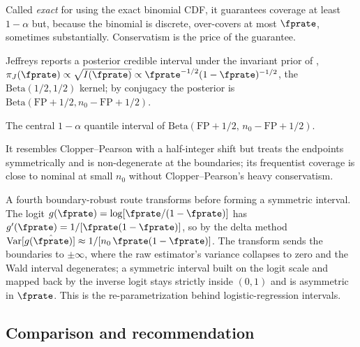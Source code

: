 Called \emph{exact} for using the exact binomial CDF, it guarantees coverage
at least $1 - \alpha$ but, because the binomial is discrete, over-covers at
most $\fprate$, sometimes substantially. Conservatism is the price of the
guarantee.

Jeffreys reports a posterior credible interval under the invariant prior of
\textcite{jeffreys-1946}, $\pi_J(\fprate) \propto \sqrt{I(\fprate)} \propto
\fprate^{-1/2}(1 - \fprate)^{-1/2}$, the $\mathrm{Beta}(1/2, 1/2)$ kernel; by conjugacy the posterior is
$\mathrm{Beta}(\mathrm{FP} + 1/2, n_0 - \mathrm{FP} + 1/2)$.

\begin{definition}
\label{def:jeffreys-ci}
The central $1 - \alpha$ quantile interval of $\mathrm{Beta}(\mathrm{FP} +
1/2,\, n_0 - \mathrm{FP} + 1/2)$.
\end{definition}

It resembles Clopper--Pearson with a half-integer shift but treats the
endpoints symmetrically and is non-degenerate at the boundaries; its
frequentist coverage is close to nominal at small $n_0$ without
Clopper--Pearson's heavy conservatism.

\begin{remark}
\label{rem:log-odds}
A fourth boundary-robust route transforms before forming a symmetric interval.
The logit $g(\fprate) = \log[\fprate/(1 - \fprate)]$ has $g'(\fprate) =
1/[\fprate(1 - \fprate)]$, so by the delta method
$\mathrm{Var}[g(\hat{\fprate})] \approx 1/[n_0\,\fprate(1 - \fprate)]$. The
transform sends the boundaries to $\pm\infty$, where the raw estimator's
variance collapses to zero and the Wald interval degenerates; a symmetric
interval built on the logit scale and mapped back by the inverse logit stays
strictly inside $(0,1)$ and is asymmetric in $\fprate$. This is the
re-parametrization behind logistic-regression intervals.
\end{remark}

\subsection*{Comparison and recommendation}

